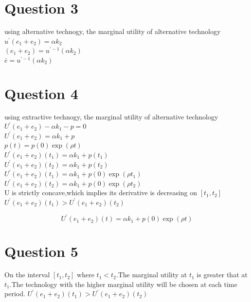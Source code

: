 \documentclass[12pt]{article}
\numberwithin{equation}{subsection} %
\begin{document}
\section{Question 3}
using alternative technogy, the marginal utility of alternative technology\\

$ u^{\prime}(e_{1}+e_{2})= \alpha k_{2} $\\

$(e_{1}+e_{2})=u^{\prime-1}(\alpha k_{2})$\\

$\bar{e}=u^{\prime-1}(\alpha k_{2})$\\



\section{Question 4}
using extractive technogy, the marginal utility of alternative technology\\

$U^{\prime}(e_{1}+e_{2})-\alpha k_{1}-p= 0$\\

$U^{\prime}(e_{1}+e_{2})=\alpha k_{1}+p$\\

$p(t)=p(0)\exp(\rho t)$\\

$U^{\prime}(e_{1}+e_{2})(t_{1})=\alpha k_{1}+p(t_{1})$\\

$U^{\prime}(e_{1}+e_{2})(t_{2})=\alpha k_{1}+p(t_{2})$\\

$U^{\prime}(e_{1}+e_{2})(t_{1})=\alpha k_{1}+p(0)\exp(\rho t_{1})$\\

$U^{\prime}(e_{1}+e_{2})(t_{2})=\alpha k_{1}+p(0)\exp(\rho t_{2})$\\
U is strictly concave,which implies its derivative is decreasing on $[t_{1},t_{2}]$\\
$U^{\prime}(e_{1}+e_{2})(t_{1}) >U^{\prime}(e_{1}+e_{2})(t_{2})$

\begin{equation}
U^{\prime}(e_{1}+e_{2})(t)=\alpha k_{1}+p(0)\exp(\rho t)
 \end{equation}

\section{Question 5}
On the interval $[t_{1},t_{2}] $ where $t_{1}<t_{2}$.The marginal utility at $t_{1}$ is greater that at $t_{1}$.The technology with the higher marginal utility will be chosen at each time period.
$U^{\prime}(e_{1}+e_{2})(t_{1}) >U^{\prime}(e_{1}+e_{2})(t_{2})$
\end{document}
